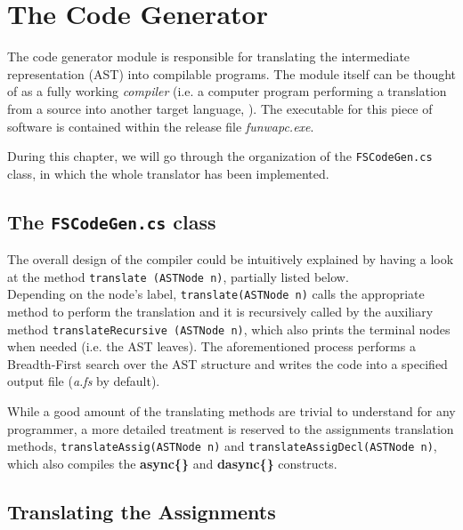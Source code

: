 
\chapter{\label{chapter5} The \fsharp Code Generator}

The code generator module is responsible for translating the \fwap intermediate representation (AST) into compilable \fsharp programs. The module itself can be thought of as a fully working \textit{compiler} (i.e. a computer program performing a translation from a source into another target language, \cite{dragon}). The executable for this piece of software is contained within the release file \textit{funwapc.exe}. 

During this chapter, we will go through the organization of the \texttt{FSCodeGen.cs} class, in which the whole translator has been implemented.

\section{The \texttt{FSCodeGen.cs} class}

The overall design of the compiler could be intuitively explained by having a look at the method \texttt{translate (ASTNode n)}, partially listed below. \\




Depending on the node's label, \texttt{translate(ASTNode n)} calls the appropriate method to perform the translation and it is recursively called by the auxiliary method \texttt{translateRecursive (ASTNode n)}, which also prints the terminal nodes when needed (i.e. the AST leaves). The aforementioned process performs a Breadth-First search over the AST structure and writes the \fsharp code into a specified output file (\textit{a.fs} by default).

While a good amount of the translating methods are trivial to understand for any programmer, a more detailed treatment is reserved to the assignments translation methods, \texttt{translateAssig(ASTNode n)} and \texttt{translateAssigDecl(ASTNode n)}, which also compiles the \textbf{async\{\}} and \textbf{dasync\{\}} constructs.

\section{Translating the Assignments}

